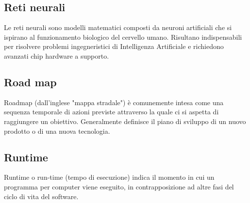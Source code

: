 \subsection*{Reti neurali}
Le reti neurali sono modelli matematici composti da neuroni artificiali che si ispirano al funzionamento biologico del cervello umano.
Risultano indispensabili per risolvere problemi ingegneristici di Intelligenza Artificiale e richiedono avanzati chip hardware a supporto.

\subsection*{Road map}
Roadmap (dall'inglese "mappa stradale") è comunemente intesa come una sequenza temporale di azioni previste attraverso la quale ci si aspetta di raggiungere un obiettivo. Generalmente definisce il piano di sviluppo di un nuovo prodotto o di una nuova tecnologia.

\subsection*{Runtime}
Runtime o run-time (tempo di esecuzione) indica il momento in cui un programma per computer viene eseguito, in contrapposizione ad altre fasi del ciclo di vita del software. 

